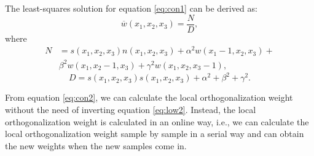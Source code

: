 The least-squares solution for equation \ref{eq:con1} can be derived as:
\begin{equation}
\label{eq:con2}
\overline{w}(x_1,x_2,x_3)=\frac{N}{D},
\end{equation}
where 
\begin{equation}
\label{eq:N}
\begin{split}
N&=s(x_1,x_2,x_3)n(x_1,x_2,x_3)+\alpha^2w(x_1-1,x_2,x_3) +\\
 &\beta^2w(x_1,x_2-1,x_3) + \gamma^2w(x_1,x_2,x_3-1),
\end{split}
\end{equation}
\begin{equation}
\label{eq:D}
D=s(x_1,x_2,x_3)s(x_1,x_2,x_3) + \alpha^2+\beta^2+\gamma^2.
\end{equation}

From equation \ref{eq:con2}, we can calculate the local orthogonalization weight without the need of inverting equation \ref{eq:low2}. Instead, the local orthogonalization weight is calculated in an online way, i.e., we can calculate the local orthogonalization weight sample by sample in a serial way and can obtain the new weights when the new samples come in. 

